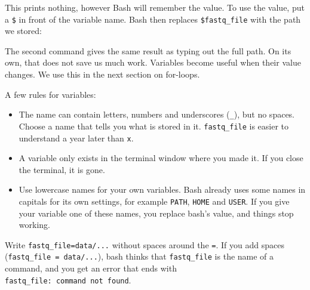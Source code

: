 \documentclass[
  letterpaper,
  DIV=11,
  numbers=noendperiod]{scrreprt}
\newenvironment{Shaded}{}{}
\newcommand{\AttributeTok}[1]{\textcolor[rgb]{0.84,0.23,0.29}{#1}}
\newcommand{\BuiltInTok}[1]{\textcolor[rgb]{0.84,0.23,0.29}{#1}}
\newcommand{\CommentTok}[1]{\textcolor[rgb]{0.42,0.45,0.49}{#1}}
\newcommand{\FunctionTok}[1]{\textcolor[rgb]{0.44,0.26,0.76}{#1}}
\newcommand{\KeywordTok}[1]{\textcolor[rgb]{0.84,0.23,0.29}{#1}}
\newcommand{\VariableTok}[1]{\textcolor[rgb]{0.89,0.38,0.04}{#1}}
\providecommand{\tightlist}{%
  \setlength{\itemsep}{0pt}\setlength{\parskip}{0pt}}
\begin{document}
This prints nothing, however Bash will remember the value. To use the
value, put a \texttt{\$} in front of the variable name. Bash then
replaces \texttt{\$fastq\_file} with the path we stored:

\begin{Shaded}
\end{Shaded}

The second command gives the same result as typing out the full path. On
its own, that does not save us much work. Variables become useful when
their value changes. We use this in the next section on for-loops.

A few rules for variables:

\begin{itemize}
\tightlist
\item
  The name can contain letters, numbers and underscores (\texttt{\_}),
  but no spaces. Choose a name that tells you what is stored in it.
  \texttt{fastq\_file} is easier to understand a year later than
  \texttt{x}.
\item
  A variable only exists in the terminal window where you made it. If
  you close the terminal, it is gone.
\item
  Use lowercase names for your own variables. Bash already uses some
  names in capitals for its own settings, for example \texttt{PATH},
  \texttt{HOME} and \texttt{USER}. If you give your variable one of
  these names, you replace bash's value, and things stop working.
\end{itemize}

\begin{tcolorbox}[enhanced jigsaw, coltitle=black, breakable, titlerule=0mm, colback=white, rightrule=.15mm, bottomrule=.15mm, toprule=.15mm, colframe=quarto-callout-important-color-frame, colbacktitle=quarto-callout-important-color!10!white, bottomtitle=1mm, opacitybacktitle=0.6, toptitle=1mm, leftrule=.75mm, arc=.35mm, title=\textcolor{quarto-callout-important-color}{\faExclamation}\hspace{0.5em}{Important: No spaces around =}, left=2mm, opacityback=0]

Write \texttt{fastq\_file=data/...} without spaces around the
\texttt{=}. If you add spaces (\texttt{fastq\_file\ =\ data/...}), bash
thinks that \texttt{fastq\_file} is the name of a command, and you get
an error that ends with \texttt{fastq\_file:\ command\ not\ found}.

\end{tcolorbox}
\end{document}
